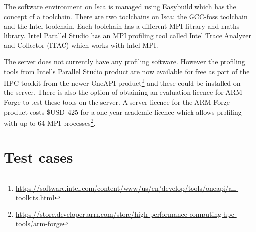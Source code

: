 \documentclass[a4paper,titlepage]{article}
\begin{document}
The software environment on Isca is managed using Easybuild which has the concept of a toolchain. There are two toolchains on Isca: the GCC-foss toolchain and the Intel toolchain. Each toolchain has a different MPI library and maths library. Intel Parallel Studio has an MPI profiling tool called Intel Trace Analyzer and Collector (ITAC) which works with Intel MPI.

The server does not currently have any profiling software. However the profiling tools from Intel's Parallel Studio product are now available for free as part of the HPC toolkit from the newer OneAPI product\footnote{\url{https://software.intel.com/content/www/us/en/develop/tools/oneapi/all-toolkits.html}} and these could be installed on the server. There is also the option of obtaining an evaluation licence for ARM Forge to test these tools on the server. A server licence for the ARM Forge product costs \$USD~425 for a one year academic licence which allows profiling with up to 64 MPI processes\footnote{\url{https://store.developer.arm.com/store/high-performance-computing-hpc-tools/arm-forge}}.


\section{Test cases}
\label{section:test_cases}
\end{document}
